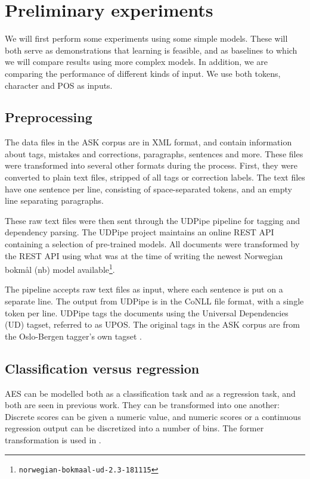 \chapter{Preliminary experiments}

We will first perform some experiments using some simple models. These will
both serve as demonstrations that learning is feasible, and as baselines to
which we will compare results using more complex models. In addition, we are
comparing the performance of different kinds of input. We use both tokens,
character \ngrams and \ac{POS} \ngrams as inputs.


\section{Preprocessing}

The data files in the ASK corpus are in \ac{XML} format, and contain
information about tags, mistakes and corrections, paragraphs, sentences and
more. These files were transformed into several other formats during the
process. First, they were converted to plain text files, stripped of all tags
or correction labels. The text files have one sentence per line, consisting
of space-separated tokens, and an empty line separating paragraphs.

These raw text files were then sent through the UDPipe pipeline
\autocite{udpipe:2017} for tagging and dependency parsing. The UDPipe project
maintains an online REST \ac{API} containing a selection of pre-trained
models. All documents were transformed by the REST \ac{API} using what was at
the time of writing the newest Norwegian bokmål (nb) model
available\footnote{\texttt{norwegian-bokmaal-ud-2.3-181115}}.

The pipeline accepts raw text files as input, where each sentence is put on a
separate line. The output from UDPipe is in the CoNLL file format, with a
single token per line. UDPipe tags the documents using the Universal
Dependencies (UD) tagset, referred to as UPOS. The original tags in the ASK
corpus are from the Oslo-Bergen tagger's own tagset \autocite{oslobergen}.


\section{Classification versus regression}

\ac{AES} can be modelled both as a classification task and as a regression
task, and both are seen in previous work. They can be transformed into one
another: Discrete scores can be given a numeric value, and numeric scores or
a continuous regression output can be discretized into a number of bins. The
former transformation is used in \textcite{vajjala17}.

